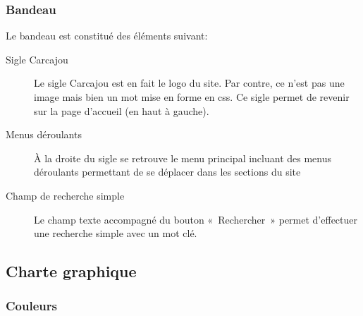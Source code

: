\documentclass[letter, 10pt]{report}
\begin{document}
\subsubsection{Bandeau}

Le bandeau est constitué des éléments suivant:
\begin{description}
	\item[Sigle Carcajou] Le sigle Carcajou est en fait le logo du site. Par contre, ce n'est pas une image mais bien un mot mise en forme en css. Ce sigle permet de revenir sur la page d'accueil (en haut à gauche).
	\item[Menus déroulants]À la droite du sigle se retrouve le menu principal incluant des menus déroulants permettant de se déplacer dans les sections du site
	\item[Champ de recherche simple] Le champ texte accompagné du bouton «~Rechercher~» permet d'effectuer une recherche simple avec un mot clé.
\end{description}


\subsection{Charte graphique}


\subsubsection{Couleurs}
\end{document}
